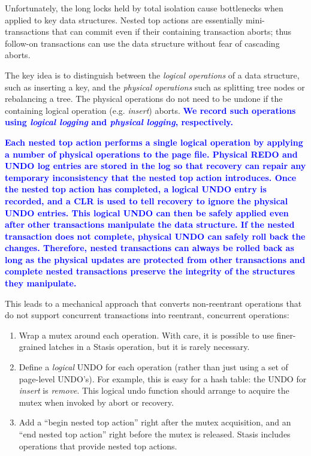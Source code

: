 \documentclass[letterpaper,twocolumn,10pt]{article}
\newcommand{\yad}{Stasis\xspace}
\newcommand{\diff}[1]{\textcolor{blue}{\bf #1}}
\begin{document}
Unfortunately, the long locks held by total isolation cause
bottlenecks when applied to key data structures.  Nested top actions
are essentially mini-transactions that can commit even if their
containing transaction aborts; thus follow-on transactions can use the
data structure without fear of cascading aborts.

The key idea is to distinguish between the {\em logical operations} of a
data structure, such as inserting a key, and the {\em physical operations}
such as splitting tree nodes or rebalancing a tree. The physical
operations do not need to be undone if the containing logical operation
(e.g. {\em insert}) aborts.  \diff{We record such operations using {\em logical 
logging} and {\em physical logging}, respectively.}

\diff{Each nested top action performs a single logical operation by
applying a number of physical operations to the page file.  Physical
REDO and UNDO log entries are stored in the log so that recovery can
repair any temporary inconsistency that the nested top action
introduces.  Once the nested top action has completed, a logical UNDO
entry is recorded, and a CLR is used to tell recovery to ignore the
physical UNDO entries.  This logical UNDO can then be safely applied
even after other transactions manipulate the data structure.  If the
nested transaction does not complete, physical UNDO can safely roll
back the changes.  Therefore, nested transactions can always be rolled
back as long as the physical updates are protected from other
transactions and complete nested transactions preserve the integrity
of the structures they manipulate.}

This leads to a mechanical approach that converts non-reentrant
operations that do not support concurrent transactions into reentrant,
concurrent operations:

\begin{enumerate}
\item Wrap a mutex around each operation.  With care, it is possible 
  to use finer-grained latches in a \yad operation, but it is rarely necessary.
\item Define a {\em logical} UNDO for each operation (rather than just
  using a set of page-level UNDO's).  For example, this is easy for a
  hash table: the UNDO for {\em insert} is {\em remove}.  This logical
  undo function should arrange to acquire the mutex when invoked by
  abort or recovery.
\item Add a ``begin nested top action'' right after the mutex
  acquisition, and an ``end nested top action'' right before the mutex
  is released.  \yad includes operations that provide nested top
  actions.
\end{enumerate}
\end{document}
